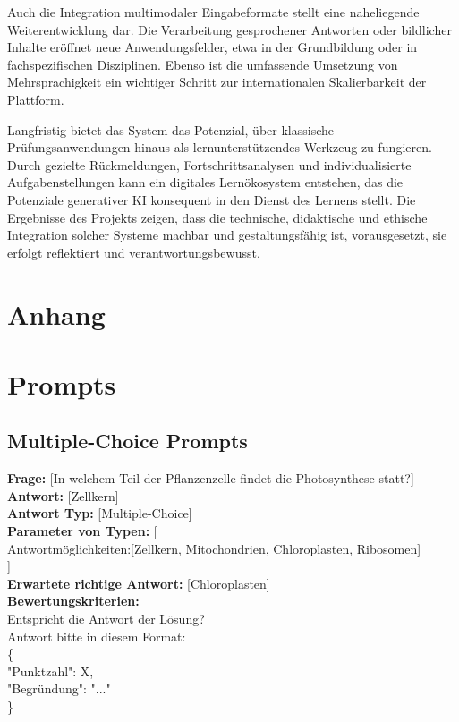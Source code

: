 \documentclass[a4paper,12pt]{article}
\begin{document}
Auch die Integration multimodaler Eingabeformate stellt eine naheliegende Weiterentwicklung dar. Die Verarbeitung gesprochener Antworten oder bildlicher Inhalte eröffnet neue Anwendungsfelder, etwa in der Grundbildung oder in fachspezifischen Disziplinen. Ebenso ist die umfassende Umsetzung von Mehrsprachigkeit ein wichtiger Schritt zur internationalen Skalierbarkeit der Plattform.

Langfristig bietet das System das Potenzial, über klassische Prüfungsanwendungen hinaus als lernunterstützendes Werkzeug zu fungieren. Durch gezielte Rückmeldungen, Fortschrittsanalysen und individualisierte Aufgabenstellungen kann ein digitales Lernökosystem entstehen, das die Potenziale generativer KI konsequent in den Dienst des Lernens stellt. Die Ergebnisse des Projekts zeigen, dass die technische, didaktische und ethische Integration solcher Systeme machbar und gestaltungsfähig ist, vorausgesetzt, sie erfolgt reflektiert und verantwortungsbewusst.

\newpage

\section{Anhang}
\label{anhang}
\appendix


\section{Prompts}

\subsection{Multiple-Choice Prompts}

\textbf{Frage:} [In welchem Teil der Pflanzenzelle findet die Photosynthese statt?] \\
\textbf{Antwort:} [Zellkern] \\
\textbf{Antwort Typ:} [Multiple-Choice] \\
\textbf{Parameter von Typen:} [\\
Antwortmöglichkeiten:[Zellkern, Mitochondrien, Chloroplasten, Ribosomen] \\
] \\
\textbf{Erwartete richtige Antwort:} [Chloroplasten] \\
\textbf{Bewertungskriterien:} \\
Entspricht die Antwort der Lösung? \\
Antwort bitte in diesem Format: \\
\{ \\
"Punktzahl": X, \\
"Begründung": "..." \\
\}
\end{document}
